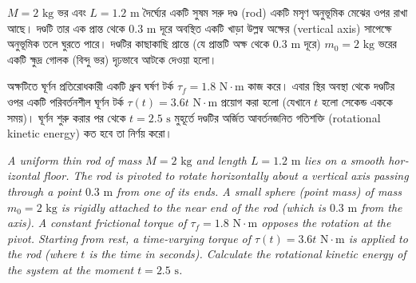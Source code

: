 \documentclass[12pt, a4paper]{article}
\begin{document}
\begin{tcolorbox}[questionbox={প্রশ্ন (Question) 16}]
\noindent
$M = 2\text{ kg}$ ভর এবং $L = 1.2\text{ m}$ দৈর্ঘ্যের একটি সুষম সরু দণ্ড (rod) একটি মসৃণ অনুভূমিক মেঝের ওপর রাখা আছে। দণ্ডটি তার এক প্রান্ত থেকে $0.3\text{ m}$ দূরে অবস্থিত একটি খাড়া উল্লম্ব অক্ষের (vertical axis) সাপেক্ষে অনুভূমিক তলে ঘুরতে পারে। দণ্ডটির কাছাকাছি প্রান্তে (যে প্রান্তটি অক্ষ থেকে $0.3\text{ m}$ দূরে) $m_0 = 2\text{ kg}$ ভরের একটি ক্ষুদ্র গোলক (বিন্দু ভর) দৃঢ়ভাবে আটকে দেওয়া হলো। 

\vspace{0.3em}
\noindent
অক্ষটিতে ঘূর্ণন প্রতিরোধকারী একটি ধ্রুব ঘর্ষণ টর্ক $\tau_f = 1.8\text{ N}\cdot\text{m}$ কাজ করে। এবার স্থির অবস্থা থেকে দণ্ডটির ওপর একটি পরিবর্তনশীল ঘূর্ণন টর্ক $\tau(t) = 3.6 t\text{ N}\cdot\text{m}$ প্রয়োগ করা হলো (যেখানে $t$ হলো সেকেন্ড এককে সময়)। ঘূর্ণন শুরু করার পর থেকে $t = 2.5\text{ s}$ মুহূর্তে দণ্ডটির অর্জিত আবর্তনজনিত গতিশক্তি (rotational kinetic energy) কত হবে তা নির্ণয় করো।

\vspace{0.8em}
\begin{english}
\noindent\textit{\color{darkgray}
A uniform thin rod of mass $M = 2\text{ kg}$ and length $L = 1.2\text{ m}$ lies on a smooth horizontal floor. The rod is pivoted to rotate horizontally about a vertical axis passing through a point $0.3\text{ m}$ from one of its ends. A small sphere (point mass) of mass $m_0 = 2\text{ kg}$ is rigidly attached to the near end of the rod (which is $0.3\text{ m}$ from the axis). A constant frictional torque of $\tau_f = 1.8\text{ N}\cdot\text{m}$ opposes the rotation at the pivot. Starting from rest, a time-varying torque of $\tau(t) = 3.6 t\text{ N}\cdot\text{m}$ is applied to the rod (where $t$ is the time in seconds). Calculate the rotational kinetic energy of the system at the moment $t = 2.5\text{ s}$.
}
\end{english}
\end{tcolorbox}
\end{document}
